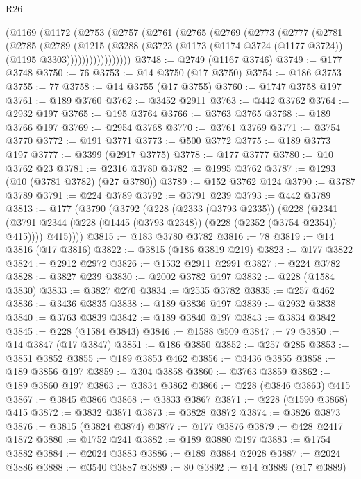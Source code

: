 \begin{lexlean}{R26}
\begin{coremodule}
    (@1169
      (@1172
        (@2753
          (@2757
            (@2761
              (@2765
                (@2769
                  (@2773
                    (@2777
                      (@2781
                        (@2785
                          (@2789
                            (@1215
                              (@3288
                                (@3723
                                  (@1173 (@1174 @3724 (@1177 @3724)) (@1195 @3303)))))))))))))))))
@3748 := @2749 (@1167 @3746)
@3749 := @177 @3748
@3750 := 76
@3753 := @14 @3750 (@17 @3750)
@3754 := @186 @3753
@3755 := 77
@3758 := @14 @3755 (@17 @3755)
@3760 := @1747 @3758 @197
@3761 := @189 @3760
@3762 := @3452 @2911
@3763 := @442 @3762
@3764 := @2932 @197
@3765 := @195 @3764
@3766 := @3763 @3765
@3768 := @189 @3766 @197
@3769 := @2954 @3768
@3770 := @3761 @3769
@3771 := @3754 @3770
@3772 := @191 @3771
@3773 := @500 @3772
@3775 := @189 @3773 @197
@3777 := @3399 (@2917 @3775)
@3778 := @177 @3777
@3780 := @10 @3762 @23
@3781 := @2316 @3780
@3782 := @1995 @3762
@3787 := @1293 (@10 (@3781 @3782) (@27 @3780))
@3789 := @152 @3762 @124
@3790 := @3787 @3789
@3791 := @224 @3789
@3792 := @3791 @239
@3793 := @442 @3789
@3813 := @177
    (@3790
      (@3792
        (@228
          (@2333 (@3793 @2335))
          (@228
            (@2341 (@3791 @2344 (@228 (@1445 (@3793 @2348)) (@228 (@2352 (@3754 @2354)) @415))))
            @415))))
@3815 := @183 @3780 @3782
@3816 := 78
@3819 := @14 @3816 (@17 @3816)
@3822 := @3815 (@186 @3819 @219)
@3823 := @177 @3822
@3824 := @2912 @2972
@3826 := @1532 @2911 @2991
@3827 := @224 @3782
@3828 := @3827 @239
@3830 := @2002 @3782 @197
@3832 := @228 (@1584 @3830)
@3833 := @3827 @270
@3834 := @2535 @3782
@3835 := @257 @462
@3836 := @3436 @3835
@3838 := @189 @3836 @197
@3839 := @2932 @3838
@3840 := @3763 @3839
@3842 := @189 @3840 @197
@3843 := @3834 @3842
@3845 := @228 (@1584 @3843)
@3846 := @1588 @509
@3847 := 79
@3850 := @14 @3847 (@17 @3847)
@3851 := @186 @3850
@3852 := @257 @285
@3853 := @3851 @3852
@3855 := @189 @3853 @462
@3856 := @3436 @3855
@3858 := @189 @3856 @197
@3859 := @304 @3858
@3860 := @3763 @3859
@3862 := @189 @3860 @197
@3863 := @3834 @3862
@3866 := @228 (@3846 @3863) @415
@3867 := @3845 @3866
@3868 := @3833 @3867
@3871 := @228 (@1590 @3868) @415
@3872 := @3832 @3871
@3873 := @3828 @3872
@3874 := @3826 @3873
@3876 := @3815 (@3824 @3874)
@3877 := @177 @3876
@3879 := @428 @2417 @1872
@3880 := @1752 @241
@3882 := @189 @3880 @197
@3883 := @1754 @3882
@3884 := @2024 @3883
@3886 := @189 @3884 @2028
@3887 := @2024 @3886
@3888 := @3540 @3887
@3889 := 80
@3892 := @14 @3889 (@17 @3889)

\end{coremodule}
\end{lexlean}
